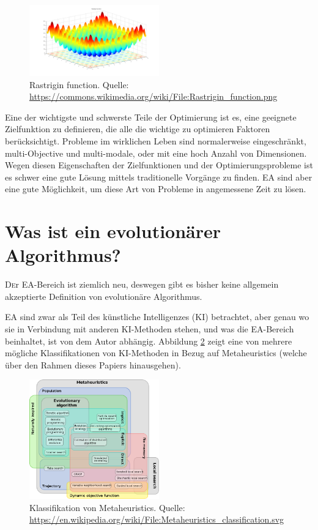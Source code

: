 \documentclass[twoside,twocolumn]{article}
\begin{document}
\begin{figure}[h]
\caption{ Rastrigin function. Quelle: \url{https://commons.wikimedia.org/wiki/File:Rastrigin_function.png}}
\label{fig:rastrigin}
\centering
\includegraphics[width=0.5\textwidth]{images/rastrigin_function.png}
\end{figure}

Eine der wichtigste und schwerste Teile der Optimierung ist es, eine geeignete Zielfunktion zu definieren, die alle die wichtige zu optimieren Faktoren berücksichtigt.
Probleme im wirklichen Leben sind normalerweise eingeschränkt, multi-Objective und multi-modale, oder mit eine hoch Anzahl von Dimensionen. Wegen diesen Eigenschaften der Zielfunktionen und der Optimierungsprobleme ist es schwer eine gute Lösung mittels traditionelle Vorgänge  zu finden. EA sind aber eine gute Möglichkeit, um diese Art von Probleme in angemessene Zeit zu lösen.


\section{Was ist ein evolutionärer Algorithmus?}

\lettrine[nindent=0em,lines=3]{D} er EA-Bereich ist ziemlich neu, deswegen gibt es bisher keine allgemein akzeptierte Definition von evolutionäre Algorithmus.\par
EA sind zwar als Teil des künstliche Intelligenzes (KI) betrachtet, aber genau wo sie in Verbindung mit anderen KI-Methoden stehen, und was die EA-Bereich beinhaltet, ist von dem Autor abhängig. Abbildung \ref{fig:metaheuristics} zeigt eine von mehrere mögliche Klassifikationen von KI-Methoden in Bezug auf Metaheuristics (welche über den Rahmen dieses Papiers hinausgehen).\\

\begin{figure}[h]
\caption{ Klassifikation von Metaheuristics. Quelle: \url{https://en.wikipedia.org/wiki/File:Metaheuristics_classification.svg}}
\label{fig:metaheuristics}
\centering
\includegraphics[width=0.5\textwidth]{images/metaheuristics_classification.png}
\end{figure}
\end{document}
